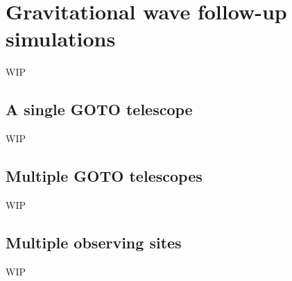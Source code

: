 \section{Gravitational wave follow-up simulations}
\label{sec:gw_sims}
\begin{colsection}


\begin{colsection}

WIP

\end{colsection}


\subsection{A single GOTO telescope}
\label{sec:gw_onetel}
\begin{colsection}

WIP

\end{colsection}


\subsection{Multiple GOTO telescopes}
\label{sec:gw_multitel}
\begin{colsection}

WIP

\end{colsection}


\subsection{Multiple observing sites}
\label{sec:gw_multisite}
\begin{colsection}

WIP

\end{colsection}


\end{colsection}


